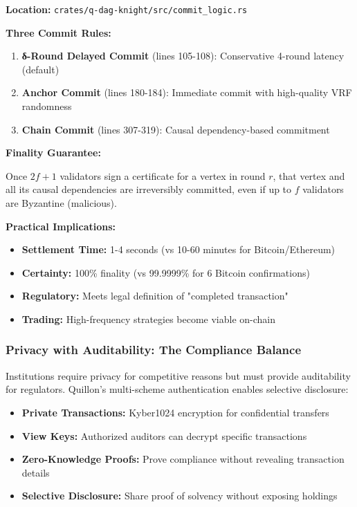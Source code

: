 \documentclass[11pt,a4paper]{article}
\begin{document}
\textbf{Location:} \texttt{crates/q-dag-knight/src/commit\_logic.rs}

\textbf{Three Commit Rules:}
\begin{enumerate}[leftmargin=*]
\item \textbf{δ-Round Delayed Commit} (lines 105-108): Conservative 4-round latency (default)
\item \textbf{Anchor Commit} (lines 180-184): Immediate commit with high-quality VRF randomness
\item \textbf{Chain Commit} (lines 307-319): Causal dependency-based commitment
\end{enumerate}

\textbf{Finality Guarantee:}
\begin{tcolorbox}[colback=green!5!white,colframe=green!75!black,title=Byzantine Finality Theorem]
Once $2f+1$ validators sign a certificate for a vertex in round $r$, that vertex and all its causal dependencies are irreversibly committed, even if up to $f$ validators are Byzantine (malicious).
\end{tcolorbox}

\textbf{Practical Implications:}
\begin{itemize}[leftmargin=*]
\item \textbf{Settlement Time:} 1-4 seconds (vs 10-60 minutes for Bitcoin/Ethereum)
\item \textbf{Certainty:} 100\% finality (vs 99.9999\% for 6 Bitcoin confirmations)
\item \textbf{Regulatory:} Meets legal definition of "completed transaction"
\item \textbf{Trading:} High-frequency strategies become viable on-chain
\end{itemize}

\subsubsection{Privacy with Auditability: The Compliance Balance}

Institutions require privacy for competitive reasons but must provide auditability for regulators. Quillon's multi-scheme authentication enables selective disclosure:

\begin{itemize}[leftmargin=*]
\item \textbf{Private Transactions:} Kyber1024 encryption for confidential transfers
\item \textbf{View Keys:} Authorized auditors can decrypt specific transactions
\item \textbf{Zero-Knowledge Proofs:} Prove compliance without revealing transaction details
\item \textbf{Selective Disclosure:} Share proof of solvency without exposing holdings
\end{itemize}
\end{document}
